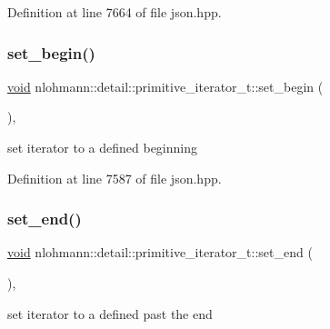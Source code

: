 Definition at line 7664 of file json.\+hpp.

\mbox{\label{classnlohmann_1_1detail_1_1primitive__iterator__t_a9d9b005906106e12aed738f97d7fee42}} 
\subsubsection{\texorpdfstring{set\_begin()}{set\_begin()}}
{\footnotesize\ttfamily \mbox{\hyperlink{namespacenlohmann_1_1detail_a59fca69799f6b9e366710cb9043aa77d}{void}} nlohmann\+::detail\+::primitive\+\_\+iterator\+\_\+t\+::set\+\_\+begin (\begin{DoxyParamCaption}{ }\end{DoxyParamCaption})\hspace{0.3cm}{\ttfamily [inline]}, {\ttfamily [noexcept]}}



set iterator to a defined beginning 



Definition at line 7587 of file json.\+hpp.

\mbox{\label{classnlohmann_1_1detail_1_1primitive__iterator__t_ad26a823483846a12d890c3feed3097eb}} 
\subsubsection{\texorpdfstring{set\_end()}{set\_end()}}
{\footnotesize\ttfamily \mbox{\hyperlink{namespacenlohmann_1_1detail_a59fca69799f6b9e366710cb9043aa77d}{void}} nlohmann\+::detail\+::primitive\+\_\+iterator\+\_\+t\+::set\+\_\+end (\begin{DoxyParamCaption}{ }\end{DoxyParamCaption})\hspace{0.3cm}{\ttfamily [inline]}, {\ttfamily [noexcept]}}



set iterator to a defined past the end 



